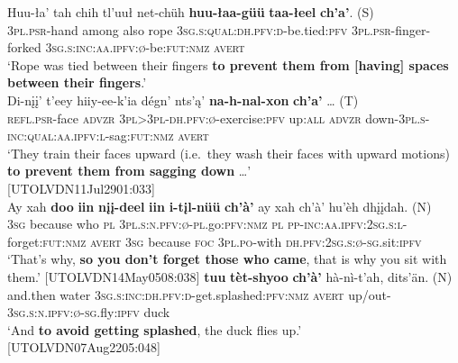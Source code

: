 \documentclass[output=paper,colorlinks,citecolor=brown
]{langscibook}
\begin{document}
\begin{exe}
\ex \label{undesirable}
\begin{xlista}
\ex\label{undesirablea}
\gll Huu-ła' tah chih tl'uuł net-chüh \textbf{huu-łaa-güü} \textbf{taa-łeel} \textbf{ch'a'}. \textnormal{(S}) \\
\textsc{3pl.psr}-hand among also rope \textsc{3sg.s:qual:dh.pfv:d}-be.tied:\textsc{pfv} \textsc{3pl.psr}-finger-forked \textsc{3sg.s:inc:aa.ipfv:ø}-be:\textsc{fut:nmz} \textsc{avert} \\
\glt `Rope was tied between their fingers \textbf{to prevent them from [having] spaces between their fingers}.' \hfill \citep[19]{TyoneM1996}\\
\ex\label{undesirableb}
\gll Di-nįį' t'eey hiiy-ee-k'ia dégn' nts'ą' \textbf{na-h-nal-xon} \textbf{ch'a'} {\ldots} \textnormal{(T)} \\
\textsc{refl.psr}-face \textsc{advzr} \textsc{3pl>3pl-dh.pfv:ø}-exercise:\textsc{pfv} up:\textsc{all} \textsc{advzr} down-\textsc{3pl.s-inc:qual:aa.ipfv:l}-sag:\textsc{fut:nmz} \textsc{avert} \\
\glt `They train their faces upward (i.e.\  they wash their faces with upward motions) \textbf{to prevent them from sagging down} \ldots' \\ \hfill [UTOLVDN11Jul2901:033] \\
\ex\label{undesirablec}
\gll Ay xah \textbf{doo} \textbf{iin} \textbf{nįį-deel} \textbf{iin} \textbf{i-tįl-nüü} \textbf{ch'à'} ay xah ch'à' hu'èh {dhįįdah. \textnormal{(N)}} \\
\textsc{3sg} because who \textsc{pl} \textsc{3pl.s:n.pfv:ø-pl}.go:\textsc{pfv:nmz} \textsc{pl} \textsc{pp-inc:aa.ipfv:2sg.s:l}-forget:\textsc{fut:nmz} \textsc{avert} \textsc{3sg} because \textsc{foc} \textsc{3pl.po}-with \textsc{dh.pfv:2sg.s:ø-sg}.sit:\textsc{ipfv} \\
\glt `That's why, \textbf{so you don't forget those who came}, that is why you sit with them.' \hfill [UTOLVDN14May0508:038] 
\ex\label{undesirabled}
 \textbf{tuu} \textbf{tèt-shyoo} \textbf{ch'à'} hà-nì-t'ah, dits'än. \textnormal{(N)}\\
and.then water \textsc{3sg.s:inc:dh.pfv:d}-get.splashed:\textsc{pfv:nmz} \textsc{avert} up/out-\textsc{3sg.s:n.ipfv:ø-sg}.fly:\textsc{ipfv} duck\\
\glt `And \textbf{to avoid getting splashed}, the duck flies up.' \\ \hfill [UTOLVDN07Aug2205:048]
\end{xlista}
\end{exe}
\end{document}
